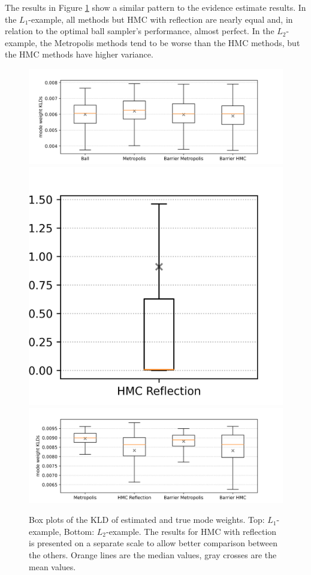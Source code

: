 \documentclass[12pt, a4paper]{report}
\begin{document}
The results in Figure \ref{fig:results_KLDs} show a similar pattern to the evidence estimate results.
In the $L_1$-example, all methods but HMC with reflection are nearly equal and, in relation to the optimal ball sampler's performance, almost perfect.
In the $L_2$-example, the Metropolis methods tend to be worse than the HMC methods, but the HMC methods have higher variance.
\begin{figure}
    \centering
    \includegraphics[trim={0cm 0cm 2cm 0cm}, clip, scale=0.4]{figs/results/KLDs_spike_20d.png}
    \includegraphics[scale=0.4]{figs/results/KLD_spike_20d_reflection.png}
    \includegraphics[scale=0.4]{figs/results/KLDs_spike_offcenter_20d.png}
    \caption{Box plots of the KLD of estimated and true mode weights. Top: $L_1$-example, Bottom: $L_2$-example. The results for HMC with reflection is presented on a separate scale to allow better comparison between the others. Orange lines are the median values, gray crosses are the mean values.}
    \label{fig:results_KLDs}
\end{figure}
\end{document}
